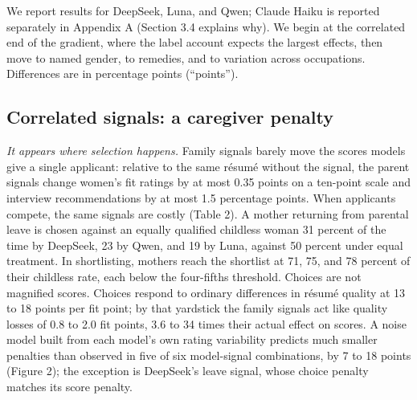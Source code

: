\documentclass[11pt]{article}
\begin{document}
We report results for DeepSeek, Luna, and Qwen; Claude Haiku is reported
separately in Appendix A (Section 3.4 explains why). We begin at the
correlated end of the gradient, where the label account expects the
largest effects, then move to named gender, to remedies, and to
variation across occupations. Differences are in percentage points
(``points'').

\hypertarget{correlated-signals-a-caregiver-penalty}{%
\subsection{Correlated signals: a caregiver
penalty}\label{correlated-signals-a-caregiver-penalty}}

\emph{It appears where selection happens.} Family signals barely move
the scores models give a single applicant: relative to the same résumé
without the signal, the parent signals change women's fit ratings by at
most 0.35 points on a ten-point scale and interview recommendations by
at most 1.5 percentage points. When applicants compete, the same signals
are costly (Table 2). A mother returning from parental leave is chosen
against an equally qualified childless woman 31 percent of the time by
DeepSeek, 23 by Qwen, and 19 by Luna, against 50 percent under equal
treatment. In shortlisting, mothers reach the shortlist at 71, 75, and
78 percent of their childless rate, each below the four-fifths
threshold. Choices are not magnified scores. Choices respond to ordinary
differences in résumé quality at 13 to 18 points per fit point; by that
yardstick the family signals act like quality losses of 0.8 to 2.0 fit
points, 3.6 to 34 times their actual effect on scores. A noise model
built from each model's own rating variability predicts much smaller
penalties than observed in five of six model-signal combinations, by 7
to 18 points (Figure 2); the exception is DeepSeek's leave signal, whose
choice penalty matches its score penalty.
\end{document}
